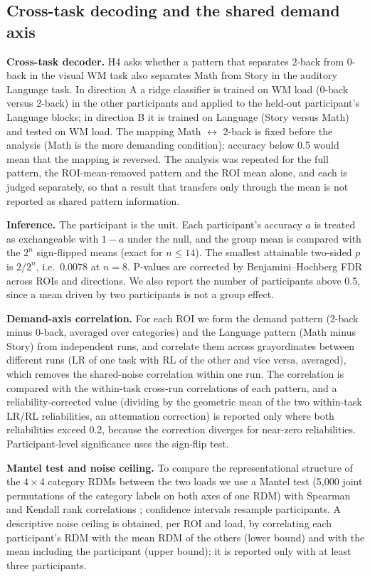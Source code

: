 \documentclass[conference]{IEEEtran}
\begin{document}
\subsection{Cross-task decoding and the shared demand axis}
\label{sec:demand}
\textbf{Cross-task decoder.} H4 asks whether a pattern that separates 2-back from 0-back in the visual WM task also separates Math from Story in the auditory Language task. In direction A a ridge classifier is trained on WM load (0-back versus 2-back) in the other participants and applied to the held-out participant's Language blocks; in direction B it is trained on Language (Story versus Math) and tested on WM load. The mapping Math $\leftrightarrow$ 2-back is fixed before the analysis (Math is the more demanding condition); accuracy below 0.5 would mean that the mapping is reversed. The analysis was repeated for the full pattern, the ROI-mean-removed pattern and the ROI mean alone, and each is judged separately, so that a result that transfers only through the mean is not reported as shared pattern information.

\textbf{Inference.} The participant is the unit. Each participant's accuracy $a$ is treated as exchangeable with $1-a$ under the null, and the group mean is compared with the $2^n$ sign-flipped means (exact for $n\le14$). The smallest attainable two-sided $p$ is $2/2^n$, i.e.\ $0.0078$ at $n=8$. P-values are corrected by Benjamini--Hochberg FDR \cite{benjamini1995} across ROIs and directions. We also report the number of participants above 0.5, since a mean driven by two participants is not a group effect.

\textbf{Demand-axis correlation.} For each ROI we form the demand pattern (2-back minus 0-back, averaged over categories) and the Language pattern (Math minus Story) from independent runs, and correlate them across grayordinates between different runs (LR of one task with RL of the other and vice versa, averaged), which removes the shared-noise correlation within one run. The correlation is compared with the within-task cross-run correlations of each pattern, and a reliability-corrected value (dividing by the geometric mean of the two within-task LR/RL reliabilities, an attenuation correction) is reported only where both reliabilities exceed 0.2, because the correction diverges for near-zero reliabilities. Participant-level significance uses the sign-flip test.

\textbf{Mantel test and noise ceiling.} To compare the representational structure of the $4\times4$ category RDMs between the two loads we use a Mantel test (5{,}000 joint permutations of the category labels on both axes of one RDM) with Spearman and Kendall rank correlations \cite{mantel1967}; confidence intervals resample participants. A descriptive noise ceiling is obtained, per ROI and load, by correlating each participant's RDM with the mean RDM of the others (lower bound) and with the mean including the participant (upper bound); it is reported only with at least three participants.
\end{document}
